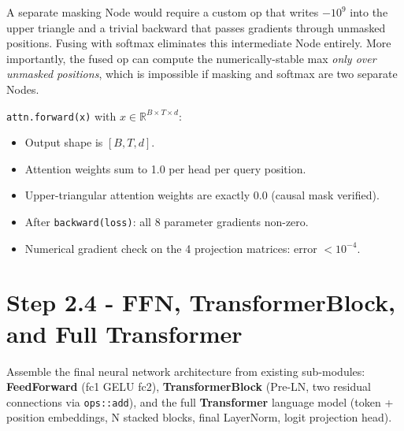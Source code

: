 \documentclass[12pt, a4paper]{article}
\begin{document}
\begin{tcolorbox}[interviewbox,
    title={Interview: Why is the causal mask fused with softmax?}]
  A separate masking Node would require a custom op that writes \(-10^9\) into
  the upper triangle and a trivial backward that passes gradients through
  unmasked positions.  Fusing with softmax eliminates this intermediate Node
  entirely.  More importantly, the fused op can compute the numerically-stable
  max \emph{only over unmasked positions}, which is impossible if masking and
  softmax are two separate Nodes.
\end{tcolorbox}

\begin{tcolorbox}[exitbox, title={Step 2.3 - Exit Criterion (met)}]
  \texttt{attn.forward(x)} with \(x \in \mathbb{R}^{B \times T \times d}\):
  \begin{itemize}
    \item Output shape is \([B, T, d]\). \checkmark
    \item Attention weights sum to 1.0 per head per query position. \checkmark
    \item Upper-triangular attention weights are exactly 0.0
          (causal mask verified). \checkmark
    \item After \texttt{backward(loss)}: all 8 parameter gradients non-zero. \checkmark
    \item Numerical gradient check on the 4 projection matrices: error \(<10^{-4}\). \checkmark
  \end{itemize}
\end{tcolorbox}

\section{Step 2.4 - FFN, TransformerBlock, and Full Transformer}

\begin{tcolorbox}[designbox, title={Step 2.4 Goal}]
  Assemble the final neural network architecture from existing sub-modules:
  \textbf{FeedForward} (fc1  GELU  fc2),
  \textbf{TransformerBlock} (Pre-LN, two residual connections via \texttt{ops::add}),
  and the full \textbf{Transformer} language model (token + position embeddings,
  N stacked blocks, final LayerNorm, logit projection head).
\end{tcolorbox}
\end{document}

